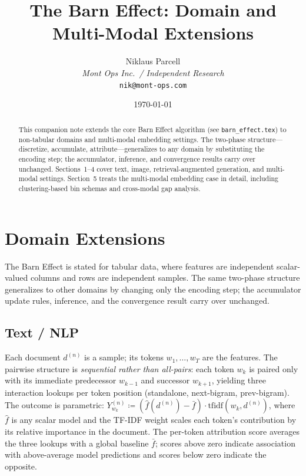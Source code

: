 \documentclass[11pt]{article}
\title{The Barn Effect: Domain and Multi-Modal Extensions}
\author{Niklaus Parcell\\
\textit{Mont Ops Inc.\ / Independent Research}\\
\texttt{nik@mont-ops.com}}
\date{\today}
\begin{document}
\maketitle

\begin{abstract}
This companion note extends the core Barn Effect algorithm (see \texttt{barn\_effect.tex}) to non-tabular domains and multi-modal embedding settings.
The two-phase structure---discretize, accumulate, attribute---generalizes to any domain by substituting the encoding step; the accumulator, inference, and convergence results carry over unchanged.
Sections~1--4 cover text, image, retrieval-augmented generation, and multi-modal settings.
Section~5 treats the multi-modal embedding case in detail, including clustering-based bin schemas and cross-modal gap analysis.
\end{abstract}

\section{Domain Extensions}
\label{app:domains}

The Barn Effect is stated for tabular data, where features are independent scalar-valued columns and rows are independent samples.
The same two-phase structure generalizes to other domains by changing only the encoding step; the accumulator update rules, inference, and the convergence result carry over unchanged.

\subsection{Text / NLP}

Each document $d^{(n)}$ is a sample; its tokens $w_1,\ldots,w_T$ are the features.
The pairwise structure is \emph{sequential rather than all-pairs}: each token $w_k$ is paired only with its immediate predecessor $w_{k-1}$ and successor $w_{k+1}$, yielding three interaction lookups per token position (standalone, next-bigram, prev-bigram).
The outcome is parametric: $Y^{(n)}_{w_k} \coloneqq (\hat{f}(d^{(n)}) - \bar{f}) \cdot \mathrm{tfidf}(w_k, d^{(n)})$, where $\hat{f}$ is any scalar model and the TF-IDF weight scales each token's contribution by its relative importance in the document.
The per-token attribution score averages the three lookups with a global baseline $\bar{f}$; scores above zero indicate association with above-average model predictions and scores below zero indicate the opposite.
\end{document}
